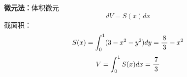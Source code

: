 \begin{center}
	\quad 
\end{center}

{\bf 微元法：}体积微元
$$dV=S(x)dx$$
截面积：
$$S(x)=\dint_0^1(3-x^2-y^2)dy=\df 83-x^2$$
$$V=\dint_0^1S(x)dx=\df 73$$

